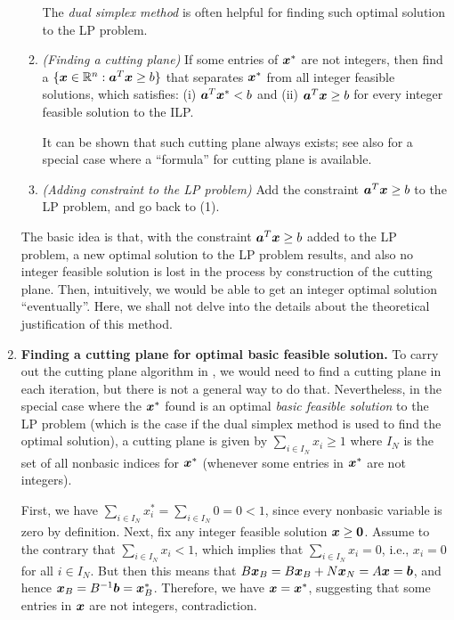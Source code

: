 \begin{enumerate}
\begin{enumerate}[label={(\arabic*)}]
\begin{note}
The \emph{dual simplex method} is often helpful for finding such optimal
solution to the LP problem.
\end{note}

\item \emph{(Finding a cutting plane)} If some entries of \(\bm{x}^{*}\) are
not integers, then find a 
\(\{\bm{x}\in\mathbb{R}^{n}:\bm{a}^{T}\bm{x}\ge b\}\) that separates
\(\bm{x}^{*}\) from all integer feasible solutions, which satisfies: (i)
\(\bm{a}^{T}\bm{x}^{*}<b\) and (ii) \(\bm{a}^{T}\bm{x}\ge b\) for every
integer feasible solution to the ILP.

\begin{note}
It can be shown that such cutting plane always exists; see also
 for a special case where a ``formula'' for
cutting plane is available.
\end{note}

\item \emph{(Adding constraint to the LP problem)} Add the constraint
\(\bm{a}^{T}\bm{x}\ge b\) to the LP problem, and go back to (1).
\end{enumerate}
The basic idea is that, with the constraint \(\bm{a}^{T}\bm{x}\ge b\)
added to the LP problem, a new optimal solution to the LP problem results, and
also no integer feasible solution is lost in the process by construction of the
cutting plane. Then, intuitively, we would be able to get an integer optimal
solution ``eventually''. Here, we shall not delve into the details about the
theoretical justification of this method.
\item\label{it:cut-plane-optim-bfs} \textbf{Finding a cutting plane for optimal
basic feasible solution.} To carry out the cutting plane algorithm in
, we would need to find a cutting plane in each
iteration, but there is not a general way to do that. Nevertheless, in the
special case where the \(\bm{x}^{*}\) found is an optimal \emph{basic
feasible solution} to the LP problem (which is the case if the dual simplex
method is used to find the optimal solution), a cutting plane is given by
\(\boxed{\sum_{i\in I_N}^{}x_i\ge 1}\) where \(I_N\) is the set of all nonbasic
indices for \(\bm{x}^{*}\) (whenever some entries in \(\bm{x}^{*}\) are not
integers).

\begin{pf}
First, we have \(\sum_{i\in I_N}^{}x_{i}^{*}=\sum_{i\in I_N}^{}0=0<1\), since
every nonbasic variable is zero by definition. Next, fix any integer feasible
solution \(\bm{x}\ge\bm{0}\). Assume to the contrary that \(\sum_{i\in
I_N}^{}x_i<1\), which implies that \(\sum_{i\in I_N}^{}x_i=0\), i.e., \(x_i=0\)
for all \(i\in I_N\). But then this means that \(B\bm{x}_{B}
=B\bm{x}_{B}+N\bm{x}_{N}=A\bm{x}=\bm{b}\), and hence
\(\bm{x}_{B}=B^{-1}\bm{b}=\bm{x}_{B}^{*}\). Therefore, we have
\(\bm{x}=\bm{x}^{*}\), suggesting that some entries in \(\bm{x}\) are not
integers, contradiction.
\end{pf}
\end{enumerate}
